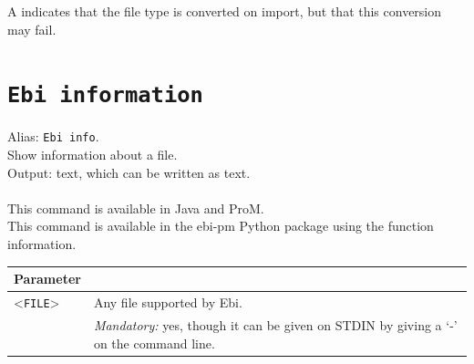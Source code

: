 {\begin{tabularx}{\linewidth}{lX}
\bottomrule
\end{tabularx}
A \textdagger{} indicates that the file type is converted on import, but that this conversion may fail.
\clearpage\section{\texttt{Ebi information}}
\label{command:Ebi information}
Alias: \texttt{Ebi info}.\\
Show information about a file.\\
\noindent Output: text, which can be written as  text.\\
\\This command is available in Java and ProM.
\\This command is available in the ebi-pm Python package using the function information.
\begin{tabularx}{\linewidth}{lX}
\toprule
Parameter \\\midrule
<\texttt{FILE}>&Any file supported by Ebi.\\
&\textit{Mandatory:} \quad yes, though it can be given on STDIN by giving a `-' on the command line.\\

\end{tabularx}}
